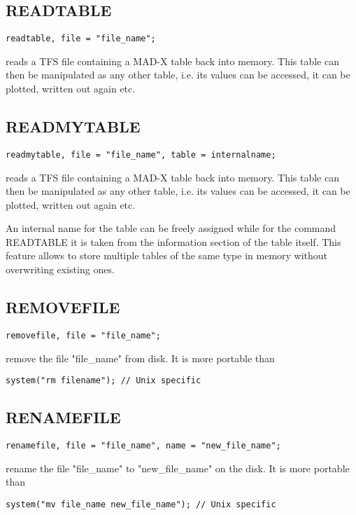 \subsection{READTABLE}
\begin{verbatim}
readtable, file = "file_name";
\end{verbatim} 
reads a TFS file containing a MAD-X table back into memory. This table
can then be manipulated as any other table, i.e. its values can be
accessed, it can be plotted, written out again etc.  


\subsection{READMYTABLE}
\label{subsec:general_readmy}
\begin{verbatim}
readmytable, file = "file_name", table = internalname;
\end{verbatim} 
reads a TFS file containing a MAD-X table back into memory. This table
can then be manipulated as any other table, i.e. its values can be
accessed, it can be plotted, written out again etc. 

An internal name for
the table can be freely assigned while for the command READTABLE it is
taken from the information section of the table itself. This feature
allows to store multiple tables of the same type in memory without
overwriting existing ones.   


\subsection{REMOVEFILE}
\begin{verbatim}
removefile, file = "file_name";
\end{verbatim} 
remove the file "file\_name" from disk. It is more portable than  
\begin{verbatim}
system("rm filename"); // Unix specific
\end{verbatim}

\subsection{RENAMEFILE}
\begin{verbatim}
renamefile, file = "file_name", name = "new_file_name";
\end{verbatim} 
rename the file "file\_name" to "new\_file\_name" on the disk. It is more
portable than  
\begin{verbatim}
system("mv file_name new_file_name"); // Unix specific
\end{verbatim}


